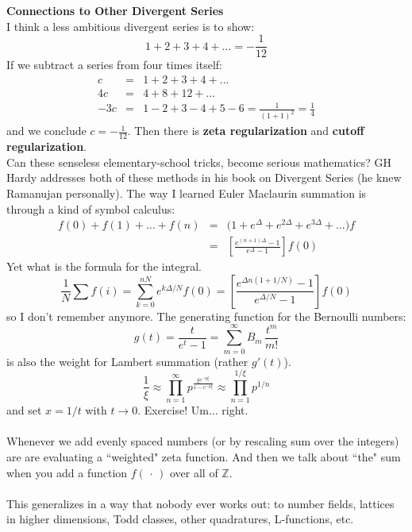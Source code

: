 \documentclass[12pt]{article}
\begin{document}
\noindent \textbf{Connections to Other Divergent Series} \\
I think a less ambitious divergent series is to show:
$$ 1 + 2 + 3 + 4 + \dots = - \frac{1}{12}$$
If we subtract a series from four times itself:
\begin{eqnarray*}
c &=& 1 + 2 + 3 + 4 + \dots \\
4c &=& 4 + 8 + 12 + \dots \\
-3c &=& 1 - 2 + 3 - 4 + 5 - 6 = \frac{1}{(1+1)^2} = \frac{1}{4}
\end{eqnarray*}
and we conclude $c = - \frac{1}{12}$.  Then there is {\color{green!50!white}\textbf{zeta regularization}}
and {\color{blue!50!white}\textbf{cutoff regularization}}. \\
\selectfont \fontsize{20}{30}\selectfont
Can these senseless elementary-school tricks, become serious mathematics?  GH Hardy addresses both of these methods in his book on Divergent Series (he knew Ramanujan personally). \newpage
{}\selectfont \fontsize{3}{5}\selectfont
\noindent The way I learned Euler Maclaurin summation is through a kind of symbol calculus:
\begin{eqnarray*} f(0)+ f(1)+ \dots + f(n) &=& 
\big(1 + e^{\Delta}
 + e^{2\Delta}
  + e^{3\Delta} 
  + \dots \big) f\\
  &=& \left[\frac{e^{(n+1)\Delta}-1}{e^\Delta - 1}\right] f(0)
  \end{eqnarray*}
Yet what is the formula for the integral.  
$$ \frac{1}{N}\sum f(i) = \sum_{k=0}^{nN} e^{k \Delta /N} f(0) = \left[ \frac{e^{\Delta n(1+1/N)} - 1}{e^{\Delta /N} - 1}\right] f(0)$$
so I don't remember anymore.  The generating function for the Bernoulli numbers:
$$ g(t) = \frac{t}{e^t - 1} = \sum_{m=0}^\infty B_m\, \frac{t^m}{m!} $$
is also the weight for Lambert summation (rather $g'(t)$). 
$$  \frac{1}{\xi} \approx 
 \prod_{n=1}^\infty p^{ \frac{\xi e^{-p\xi}}{1-e^{-p\xi}}} \approx \prod_{n=1}^{1/\xi} p^{1/n} $$
and set $x = 1/t$ with $t \to 0$.  Exercise! Um... right. \\ \\
Whenever we add evenly spaced numbers (or by rescaling sum over the integers) are are evaluating a ``weighted" zeta function.  And then we talk about ``the" sum when you add a function $f(\,\cdot\,)$ over all of $\mathbb{Z}$. \\ \\
This generalizes in a way that nobody ever works out: to number fields, lattices in higher dimensions, Todd classes, other quadratures, L-functions, etc.  
\end{document}
